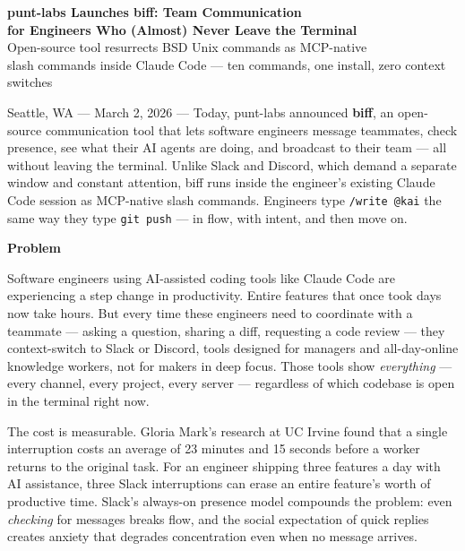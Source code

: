 \documentclass[11pt,letterpaper]{article}
\newcommand{\prsection}[1]{%
  \vspace{1em}%
  {\large\bfseries\color{SectionBlue}#1}%
  \vspace{0.3em}\par%
}
\begin{document}
\begin{center}
  {\LARGE\bfseries\color{SectionBlue}
    punt-labs Launches biff: Team Communication \\
    for Engineers Who (Almost) Never Leave the Terminal} \\[0.8em]
  {\large\color{AccentGray}
    Open-source tool resurrects BSD Unix commands as MCP-native \\
    slash commands inside Claude Code --- ten commands, one install, zero context switches}
\end{center}

\vspace{0.5em}

Seattle, WA --- March 2, 2026 --- Today, punt-labs announced
\textbf{biff}, an open-source communication tool that lets software
engineers message teammates, check presence, see what their AI agents are
doing, and broadcast to their team --- all without leaving the terminal.
Unlike Slack and Discord, which demand a separate window and constant
attention, biff runs inside the engineer's existing Claude Code session as
MCP-native slash commands. Engineers type \texttt{/write @kai} the same way
they type \texttt{git push} --- in flow, with intent, and then move on.

\prsection{Problem}

Software engineers using AI-assisted coding tools like Claude Code are
experiencing a step change in productivity. Entire features that once took
days now take hours. But every time these engineers need to coordinate with
a teammate --- asking a question, sharing a diff, requesting a code review
--- they context-switch to Slack or Discord, tools designed for managers
and all-day-online knowledge workers, not for makers in deep focus. Those
tools show \emph{everything} --- every channel, every project, every server
--- regardless of which codebase is open in the terminal right now.

The cost is measurable. Gloria Mark's research at UC Irvine found that a
single interruption costs an average of 23 minutes and 15 seconds before a
worker returns to the original task. For an engineer shipping three
features a day with AI assistance, three Slack interruptions can erase an
entire feature's worth of productive time. Slack's always-on presence model
compounds the problem: even \emph{checking} for messages breaks flow, and
the social expectation of quick replies creates anxiety that degrades
concentration even when no message arrives.
\end{document}
